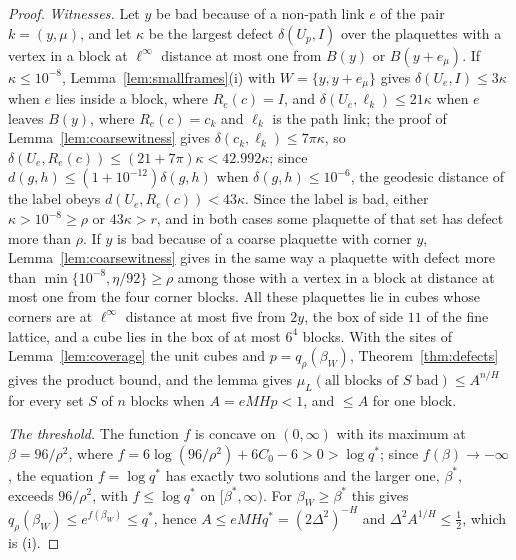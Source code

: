 \documentclass[11pt]{amsart}
\theoremstyle{definition}
\theoremstyle{remark}
\numberwithin{equation}{section}
\begin{document}
\begin{proof}
\emph{Witnesses.} Let $y$ be bad because of a non-path link $e$ of the pair
$k=(y,\mu)$, and let $\kappa$ be the largest defect $\delta(U_p,I)$ over
the plaquettes with a vertex in a block at $\ell^\infty$ distance at most
one from $B(y)$ or $B(y+e_\mu)$. If $\kappa\le10^{-8}$, Lemma~\ref{lem:smallframes}(i)
with $W=\{y,y+e_\mu\}$ gives $\delta(U_e,I)\le3\kappa$ when $e$ lies
inside a block, where $R_e(c)=I$, and $\delta(U_e,\ell_k)\le21\kappa$ when
$e$ leaves $B(y)$, where $R_e(c)=c_k$ and $\ell_k$ is the path link; the
proof of Lemma~\ref{lem:coarsewitness} gives $\delta(c_k,\ell_k)\le7\pi
\kappa$, so $\delta(U_e,R_e(c))\le(21+7\pi)\kappa<42.992\kappa$; since
$d(g,h)\le(1+10^{-12})\delta(g,h)$ when $\delta(g,h)\le10^{-6}$, the
geodesic distance of the label obeys $d(U_e,R_e(c))<43\kappa$. Since the
label is bad, either $\kappa>10^{-8}\ge\rho$ or $43\kappa>r$, and in both
cases some plaquette of that set has defect more than $\rho$. If $y$ is
bad because of a coarse plaquette with corner $y$, Lemma~\ref{lem:coarsewitness}
gives in the same way a plaquette with defect more than $\min\{10^{-8},
\eta/92\}\ge\rho$ among those with a vertex in a block at distance at most
one from the four corner blocks. All these plaquettes lie in cubes whose
corners are at $\ell^\infty$ distance at most five from $2y$, the box of
side $11$ of the fine lattice, and a cube lies in the box of at most $6^4$
blocks. With the sites of Lemma~\ref{lem:coverage} the unit cubes and
$p=q_\rho(\beta_W)$, Theorem~\ref{thm:defects} gives the product bound,
and the lemma gives $\mu_L(\text{all blocks of }S\text{ bad})\le A^{n/H}$
for every set $S$ of $n$ blocks when $A=eMHp<1$, and $\le A$ for one block.

\emph{The threshold.} The function $f$ is concave on $(0,\infty)$ with
its maximum at $\beta=96/\rho^2$, where $f=6\log(96/\rho^2)+6C_0-6>0>\log
q^*$; since $f(\beta)\to-\infty$, the equation $f=\log q^*$ has exactly two
solutions and the larger one, $\beta^*$, exceeds $96/\rho^2$, with $f\le
\log q^*$ on $[\beta^*,\infty)$. For $\beta_W\ge\beta^*$ this gives
$q_\rho(\beta_W)\le e^{f(\beta_W)}\le q^*$, hence $A\le eMHq^*=(2\varDelta^2)
^{-H}$ and $\varDelta^2A^{1/H}\le\frac12$, which is (i).


\end{proof}
\end{document}
